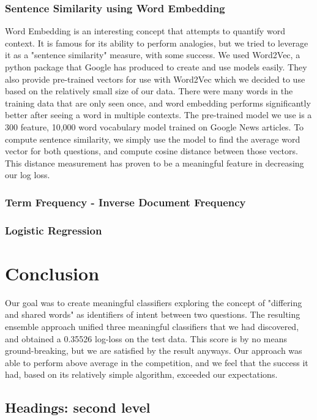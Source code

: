 \documentclass{article}
\begin{document}
\subsubsection{Sentence Similarity using Word Embedding}

Word Embedding is an interesting concept that attempts to quantify word context. It is famous for its ability to perform analogies, but we tried to leverage it as a "sentence similarity" measure, with some success. We used Word2Vec, a python package that Google has produced to create and use models easily. They also provide pre-trained vectors for use with Word2Vec which we decided to use based on the relatively small size of our data. There were many words in the training data that are only seen once, and word embedding performs significantly better after seeing a word in multiple contexts. The pre-trained model we use is a 300 feature, 10,000 word vocabulary model trained on Google News articles. To compute sentence similarity, we simply use the model to find the average word vector for both questions, and compute cosine distance between those vectors. This distance measurement has proven to be a meaningful feature in decreasing our log loss.

\subsubsection{Term Frequency - Inverse Document Frequency}

\subsubsection{Logistic Regression}


\section{Conclusion}
\label{headings}

Our goal was to create meaningful classifiers exploring the concept of "differing and shared words" as identifiers of intent between two questions. The resulting ensemble approach unified three meaningful classifiers that we had discovered, and obtained a 0.35526 log-loss on the test data. This score is by no means ground-breaking, but we are satisfied by the result anyways. Our approach was able to perform above average in the competition, and we feel that the success it had, based on its relatively simple algorithm, exceeded our expectations.

\subsection{Headings: second level}
\end{document}
